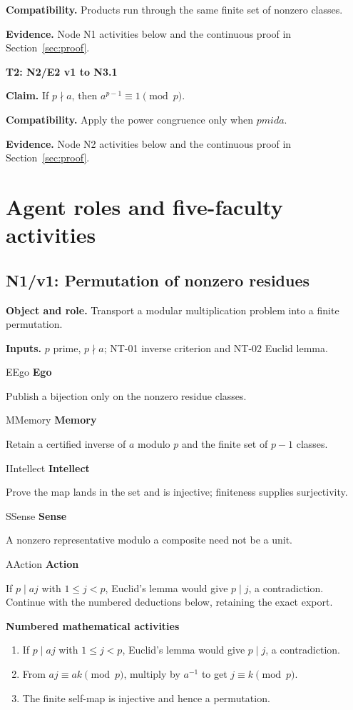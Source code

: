 \documentclass[preprint,12pt,aps,pra,showkeys,amsmath,amssymb,superscriptaddress,floatfix]{revtex4-2}
\theoremstyle{definition}
\theoremstyle{remark}
\newcommand{\mmfaculty}[3]{%
 \begin{mmfacultybox}{#1}{#2}
 {\sffamily\bfseries\color{MMBlue}#2}\par\smallskip #3
 \end{mmfacultybox}}
\newcommand{\field}[2]{\par\smallskip\noindent\textbf{#1.} #2\par}
\begin{document}
\field{Compatibility}{Products run through the same finite set of nonzero classes.}

\field{Evidence}{Node N1 activities below and the continuous proof in Section~\ref{sec:proof}.}

\smallskip\noindent\textbf{T2: N2/E2 v1 to N3.1}

\field{Claim}{If \(p\nmid a\), then \(a^{p-1}\equiv1\pmod p\).}

\field{Compatibility}{Apply the power congruence only when \(p
mid a\).}

\field{Evidence}{Node N2 activities below and the continuous proof in Section~\ref{sec:proof}.}

\endgroup

\clearpage\section{Agent roles and five-faculty activities}

\subsection{N1/v1: Permutation of nonzero residues}

\field{Object and role}{Transport a modular multiplication problem into a finite permutation.}

\field{Inputs}{\(p\) prime, \(p\nmid a\); NT-01 inverse criterion and NT-02 Euclid
lemma.}

\mmfaculty{E}{Ego}{Publish a bijection only on the nonzero residue classes.}

\mmfaculty{M}{Memory}{Retain a certified inverse of \(a\) modulo \(p\) and the finite set of
\(p-1\) classes.}

\mmfaculty{I}{Intellect}{Prove the map lands in the set and is injective; finiteness supplies
surjectivity.}

\mmfaculty{S}{Sense}{A nonzero representative modulo a composite need not be a unit.}

\mmfaculty{A}{Action}{If \(p\mid aj\) with \(1\le j<p\), Euclid's lemma would give
\(p\mid j\), a contradiction. Continue with the numbered deductions
below, retaining the exact export.}

\smallskip\noindent\textbf{Numbered mathematical activities}

\begin{enumerate}[label=N1.\arabic*,leftmargin=3.4em]

\item If \(p\mid aj\) with \(1\le j<p\), Euclid's lemma would give
\(p\mid j\), a contradiction.

\item From \(aj\equiv ak\pmod p\), multiply by \(a^{-1}\) to get
\(j\equiv k\pmod p\).

\item The finite self-map is injective and hence a permutation.

\end{enumerate}
\end{document}
